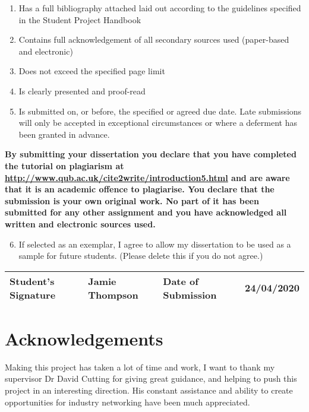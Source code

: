 \begin{enumerate}
    \item Has a full bibliography attached laid out according to the guidelines
    specified in the Student Project Handbook
    \item Contains full acknowledgement of all secondary sources used (paper-based and electronic)
    \item Does not exceed the specified page limit
    \item Is clearly presented and proof-read
    \item Is submitted on, or before, the specified or agreed due date. Late
    submissions will only be accepted in exceptional circumstances or where a
    deferment has been granted in advance.
\end{enumerate}

\textbf{
By submitting your dissertation you declare that you have completed the tutorial
on plagiarism at \url{http://www.qub.ac.uk/cite2write/introduction5.html} and
are aware that it is an academic offence to plagiarise.  You declare that the
submission is your own original work. No part of it has been submitted for any
other assignment and you have acknowledged all written and electronic sources
used.}

\begin{enumerate}
    \setcounter{enumi}{5}
    \item If selected as an exemplar, I agree to allow my dissertation to be
    used as a sample for future students. (Please delete this if you do not
    agree.)
\end{enumerate}

\begin{table}[h]
\centering
\begin{tabular}{|l|l|l|l|}
\hline
Student's Signature & Jamie Thompson & Date of Submission & 24/04/2020 \\ \hline
\end{tabular}
\end{table}

\newpage

\section*{Acknowledgements}

Making this project has taken a lot of time and work, I want to thank my
supervisor Dr David Cutting for giving great guidance, and helping to push this
project in an interesting direction. His constant assistance and ability to
create opportunities for industry networking have been much appreciated.  

